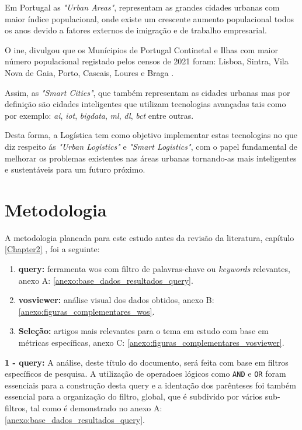 Em Portugal as \textit{"Urban Areas"}, representam as grandes cidades urbanas com maior índice populacional, onde existe um crescente aumento populacional todos os anos devido a fatores externos de imigração e de trabalho empresarial.

O  \gls{ine}, divulgou que os Munícipios de Portugal Continetal e Ilhas com maior número populacional registado pelos censos de 2021 foram:
Lisboa, Sintra, Vila Nova de Gaia, Porto, Cascais, Loures e Braga \cite{INE2022Censos}.

Assim, as \textit{"Smart Cities"}, que também representam as cidades urbanas mas por definição são cidades inteligentes que utilizam tecnologias avançadas  tais como por exemplo: \textit{\gls{ai}}, \textit{\gls{iot}}, \textit{\gls{bigdata}}, \textit{\gls{ml}}, \textit{\gls{dl}}, \textit{\gls{bct}} entre outras.

Desta forma, a Logística tem como objetivo implementar estas tecnologias no que diz respeito  ás \textit{"Urban Logistics"} e \textit{"Smart Logistics"}, com o papel fundamental de melhorar os problemas existentes nas áreas urbanas tornando-as mais inteligentes  e sustentáveis para um futuro próximo.

\section{Metodologia}
\label{sec:metodologia}
A metodologia planeada para este estudo antes da revisão da literatura, capítulo \ref{Chapter2} , foi a seguinte:
\begin{enumerate}
    \item \textbf{\gls{query}:} ferramenta \gls{wos} com filtro de palavras-chave ou \textit{keywords} relevantes, anexo A: \ref{anexo:base_dados_resultados_query}.
    \item \textbf{\gls{vosviewer}:} análise visual dos dados obtidos, anexo B: \ref{anexo:figuras_complementares_wos}.
    \item \textbf{Seleção:} artigos mais relevantes para o tema em estudo com base em métricas específicas, anexo C: \ref{anexo:figuras_complementares_vosviewer}.
\end{enumerate}

{\setlength{\parindent}{0pt}
\textbf{ 1 - \gls{query}:}
}
A análise, deste título do documento, será feita com base em filtros específicos de pesquisa.
A utilização de operadoes lógicos como \verb|AND| e \verb|OR| foram essenciais para a construção desta \gls{query} e a identação dos parênteses foi também essencial para a organização do filtro, global, que é subdivido por vários sub-filtros, tal como é demonstrado no anexo A: \ref{anexo:base_dados_resultados_query}.

